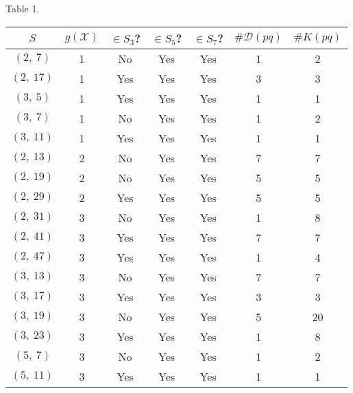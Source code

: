 \documentclass[a4paper, 12pt]{amsart}
\theoremstyle{definition}
\theoremstyle{remark}
\numberwithin{equation}{section} \numberwithin{table}{section}
\begin{document}
\begin{center}
Table 1.

\vspace{2mm}
\begin{tabular}{| c | c | c | c | c | c | c |}
\hline
$S$ & $g({{\mathcal{X}}})$ & $\in S_3$? &$\in S_5$?&$\in S_7$?&$\# {{\mathcal{D}}}(pq)$& $\# K(pq)$ \\ \hline
$(2,~7)$ &1 &No &Yes &Yes & 1&2 \\ \hline
$(2,~17)$ &1 &Yes &Yes &Yes &3& 3\\ \hline
$(3,~5)$ &1 &Yes &Yes &Yes &1 &1 \\ \hline
$(3,~7)$ &1 &No &Yes &Yes & 1&2 \\ \hline
$(3,~11)$ &1 &Yes &Yes &Yes &1 &1 \\ \hline
$(2,~13)$ &2 &No &Yes &Yes & 7&7 \\ \hline
$(2,~19)$ &2 &No &Yes &Yes & 5&5 \\ \hline
$(2,~29)$ &2 &Yes &Yes &Yes & 5& 5\\ \hline
$(2,~31)$ &3 &No &Yes &Yes &1 &8 \\ \hline
$(2,~41)$ &3 &Yes &Yes &Yes & 7&7 \\ \hline
$(2,~47)$ &3 &Yes &Yes &Yes & 1&4 \\ \hline
$(3,~13)$ &3 &No &Yes &Yes & 7&7 \\ \hline
$(3,~17)$ &3 &Yes &Yes &Yes & 3&3 \\ \hline
$(3,~19)$ &3 &No &Yes &Yes & 5&20 \\ \hline
$(3,~23)$ &3 &Yes &Yes &Yes & 1&8 \\ \hline
$(5,~7)$ &3 &No &Yes &Yes & 1&2 \\ \hline
$(5,~11)$ &3 &Yes &Yes &Yes & 1&1 \\ \hline
\end{tabular}
\end{center}


\end{document}
